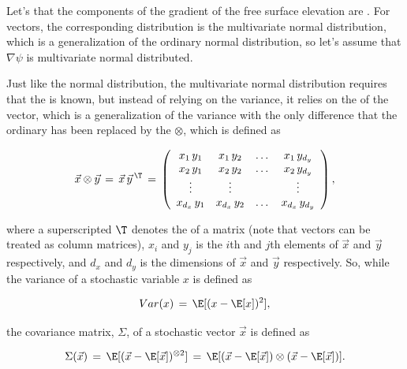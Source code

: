 Let's \assume that the components of the gradient of the free surface elevation are . For vectors, the corresponding distribution is the multivariate normal distribution, which is a generalization of the ordinary normal distribution, so let's assume that $\nabla\psi$ is multivariate normal distributed.

Just like the normal distribution, the multivariate normal distribution requires that the \mean is known, but instead of relying on the variance, it relies on the  of the vector, which is a generalization of the variance with the only difference that the ordinary  has been replaced by the  $\otimes$, which is defined as

\begin{equation} \label{eq:outer_product_definition}
\vec{x}\otimes\vec{y} \,=\, \vec{x}\,\vec{y}^{\,\T} \,=\,
\left(\begin{array}{cccc}
x_1    \,y_1 & x_1    \,y_2 & \dots & x_1    \,y_{d_y} \\
x_2    \,y_1 & x_2    \,y_2 & \dots & x_2    \,y_{d_y} \\
\vdots       & \vdots       &       & \vdots           \\
x_{d_x}\,y_1 & x_{d_x}\,y_2 & \dots & x_{d_x}\,y_{d_y}
\end{array}\right),
\end{equation}

where a superscripted $\T$ denotes the \transpose of a matrix (note that vectors can be treated as column matrices), $x_i$ and $y_j$ is the $i$th and $j$th elements of $\vec{x}$ and $\vec{y}$ respectively, and $d_x$ and $d_y$ is the dimensions of $\vec{x}$ and $\vec{y}$ respectively. So, while the variance of a stochastic variable $x$ is defined as

\begin{equation} \label{eq:variance_definition}
Var(x) \,=\, \E[(x - \E[x])^2],
\end{equation}

the covariance matrix, $\Sigma$, of a stochastic vector $\vec{x}$ is defined as

\begin{equation} \label{eq:covariance_matrix_definition}
\Sigma(\vec{x}) \,=\, \E[(\vec{x} - \E[\vec{x}])^{\otimes 2}] \,=\, \E[(\vec{x} - \E[\vec{x}])\otimes(\vec{x} - \E[\vec{x}])].
\end{equation}

